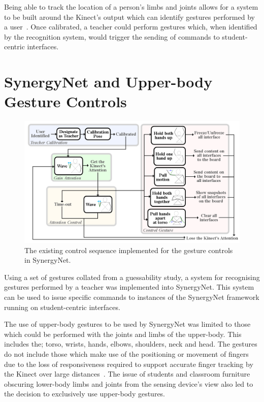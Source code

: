 \documentclass[manuscript, review, screen]{acmart}
\begin{document}
Being able to track the location of a person's limbs and joints allows for a system to be built around the Kinect's output which can identify gestures performed by a user~\cite{Davison2012,Lai2012,Patsadu2012}.
Once calibrated, a teacher could perform gestures which, when identified by the recognition system, would trigger the sending of commands to student-centric interfaces.


\section{SynergyNet and Upper-body Gesture Controls}  
\label{sec:gestures2}


\begin{figure}[t]
   \centering
   \includegraphics[width=1\textwidth]{figures/old_control_sequence_flow_diagram.png}
   \caption{The existing control sequence implemented for the gesture controls in SynergyNet.}
   \label{fig:controlSequenceFlowDiagramOriginal}
\end{figure}

Using a set of gestures collated from a guessability study, a system for recognising gestures performed by a teacher was implemented into SynergyNet.
This system can be used to issue specific commands to instances of the SynergyNet framework running on student-centric interfaces.

The use of upper-body gestures to be used by SynergyNet was limited to those which could be performed with the joints and limbs of the upper-body.
This includes the; torso, wrists, hands, elbows, shoulders, neck and head.
The gestures do not include those which make use of the positioning or movement of fingers due to the loss of responsiveness required to support accurate finger tracking by the Kinect over large distances~\cite{Oikonomidis2011a,Oikonomidis2011b}.
The issue of students and classroom furniture obscuring lower-body limbs and joints from the sensing device's view also led to the decision to exclusively use upper-body gestures.
\end{document}
